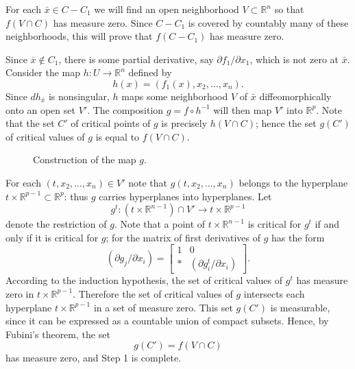For each $\bar{x} \in C - C_1$ we will find an open neighborhood $V \subset \mathbb{R}^n$ so that $f(V \cap C)$ has measure zero. Since $C - C_1$ is covered by countably many of these neighborhoods, this will prove that $f(C - C_1)$ has measure zero.

Since $\bar{x} \notin C_1$, there is some partial derivative, say $\partial f_1 / \partial x_1$, which is not zero at $\bar{x}$. Consider the map $h : U \to \mathbb{R}^n$ defined by
\[
h(x) = (f_1(x), x_2, \ldots, x_n).
\]
Since $dh_{\bar{x}}$ is nonsingular, $h$ maps some neighborhood $V$ of $\bar{x}$ diffeomorphically onto an open set $V'$. The composition $g = f \circ h^{-1}$ will then map $V'$ into $\mathbb{R}^p$. Note that the set $C'$ of critical points of $g$ is precisely $h(V \cap C)$; hence the set $g(C')$ of critical values of $g$ is equal to $f(V \cap C)$.

\begin{figure}[htbp]
\centering
\setcounter{figure}{4}%
\caption{Construction of the map $g$.}\label{fig:milnor-05}
\end{figure}



For each $(t, x_2, \ldots, x_n) \in V'$ note that $g(t, x_2, \ldots, x_n)$ belongs to the hyperplane $t \times \mathbb{R}^{p-1} \subset \mathbb{R}^p$: thus $g$ carries hyperplanes into hyperplanes. Let
\[
g^t : (t \times \mathbb{R}^{n-1}) \cap V' \to t \times \mathbb{R}^{p-1}
\]
denote the restriction of $g$. Note that a point of $t \times \mathbb{R}^{n-1}$ is critical for $g^t$ if and only if it is critical for $g$; for the matrix of first derivatives of $g$ has the form
\[
(\partial g_j / \partial x_i) = \begin{bmatrix} 1 & 0 \\ * & (\partial g_i^t / \partial x_i) \end{bmatrix}.
\]
According to the induction hypothesis, the set of critical values of $g^t$ has measure zero in $t \times \mathbb{R}^{p-1}$. Therefore the set of critical values of $g$ intersects each hyperplane $t \times \mathbb{R}^{p-1}$ in a set of measure zero. This set $g(C')$ is measurable, since it can be expressed as a countable union of compact subsets. Hence, by Fubini's theorem, the set
\[
g(C') = f(V \cap C)
\]
has measure zero, and Step 1 is complete.


